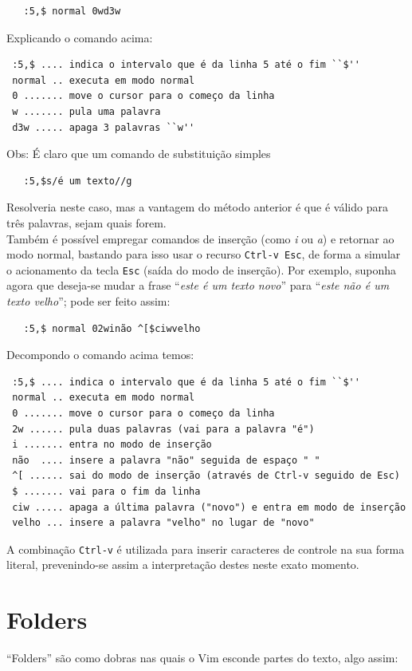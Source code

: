 \documentclass[10pt,a4paper,openany]{book}
\begin{document}
\begin{verbatim}
   :5,$ normal 0wd3w
\end{verbatim}

Explicando o comando acima:

\begin{verbatim}
 :5,$ .... indica o intervalo que é da linha 5 até o fim ``$''
 normal .. executa em modo normal
 0 ....... move o cursor para o começo da linha
 w ....... pula uma palavra
 d3w ..... apaga 3 palavras ``w''
\end{verbatim}

Obs: É claro que um comando de substituição simples

\begin{verbatim}
   :5,$s/é um texto//g
\end{verbatim}

Resolveria neste caso, mas a vantagem do método anterior é que
é válido para três palavras, sejam quais forem.\\

Também é possível empregar comandos de inserção (como {\em i} ou {\em a}) e
retornar ao modo normal, bastando para isso usar o recurso \verb|Ctrl-v Esc|,
de forma a simular o acionamento da tecla \verb|Esc| (saída do modo de
inserção). Por exemplo, suponha agora que deseja-se mudar a frase ``{\em este
é um texto novo}'' para ``{\em este não é um texto velho}''; pode ser feito
assim:

\begin{verbatim}
   :5,$ normal 02winão ^[$ciwvelho
\end{verbatim}

Decompondo o comando acima temos:

\begin{verbatim}
 :5,$ .... indica o intervalo que é da linha 5 até o fim ``$''
 normal .. executa em modo normal
 0 ....... move o cursor para o começo da linha
 2w ...... pula duas palavras (vai para a palavra "é")
 i ....... entra no modo de inserção
 não  .... insere a palavra "não" seguida de espaço " "
 ^[ ...... sai do modo de inserção (através de Ctrl-v seguido de Esc)
 $ ....... vai para o fim da linha
 ciw ..... apaga a última palavra ("novo") e entra em modo de inserção
 velho ... insere a palavra "velho" no lugar de "novo"
\end{verbatim}

A combinação \verb|Ctrl-v| é utilizada para inserir caracteres de controle na
sua forma literal, prevenindo-se assim a interpretação destes neste exato
momento.
\chapter{Folders}\label{cha:Folders}
``Folders'' são como dobras nas quais o Vim esconde partes do texto,
algo assim:
\end{document}
